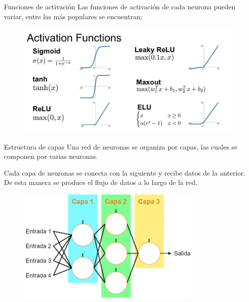\begin{frame}{Funciones de activación}
Las \alert{funciones de activación} de cada neurona pueden variar, entre las más populares se encuentran:

\begin{figure}
\centering
    \includegraphics[width=\textwidth]{figures/Tema 3/Activations.png}
    \caption{\cite{Activations}}
\end{figure}
\end{frame}

\begin{frame}{Estructura de capas}
Una red de neuronas  se organiza por \alert{capas}, las cuales se componen por varias \alert{neuronas}.

Cada \alert{capa de neuronas} se conecta con la siguiente y recibe \alert{datos} de la anterior. De esta manera se produce el \alert{flujo de datos} a lo largo de la red.

\begin{figure}
\centering
    \includegraphics[width=0.8\textwidth]{figures/Tema 3/LayerStructure.png}
\end{figure}
\end{frame}

